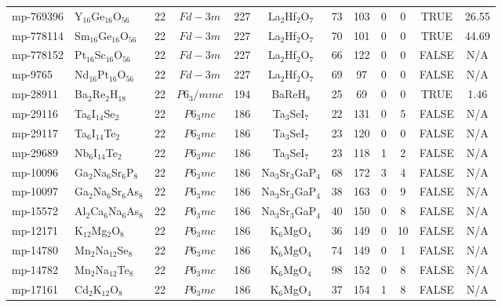 {\begin{longtable}{llcccccccccc}
    mp-769396 & Y$_{16}$Ge$_{16}$O$_{56}$ & 22    & $Fd-3m$ & 227   & La$_{2}$Hf$_{2}$O$_{7}$ & 73    & 103   & 0     & 0     & TRUE  & 26.55  \\
    mp-778114 & Sm$_{16}$Ge$_{16}$O$_{56}$ & 22    & $Fd-3m$ & 227   & La$_{2}$Hf$_{2}$O$_{7}$ & 70    & 101   & 0     & 0     & TRUE  & 44.69  \\
    mp-778152 & Pt$_{16}$Sc$_{16}$O$_{56}$ & 22    & $Fd-3m$ & 227   & La$_{2}$Hf$_{2}$O$_{7}$ & 66    & 122   & 0     & 0     & FALSE & N/A \\
    mp-9765 & Nd$_{16}$Pt$_{16}$O$_{56}$ & 22    & $Fd-3m$ & 227   & La$_{2}$Hf$_{2}$O$_{7}$ & 69    & 97    & 0     & 0     & FALSE & N/A \\
    mp-28911 & Ba$_{2}$Re$_{2}$H$_{18}$ & 22    & $P6_3/mmc$ & 194   & BaReH$_{9}$ & 25    & 69    & 0     & 0     & TRUE  & 1.46  \\
    mp-29116 & Ta$_{6}$I$_{14}$Se$_{2}$ & 22    & $P6_3mc$ & 186   & Ta$_{3}$SeI$_{7}$ & 22    & 131   & 0     & 5     & FALSE & N/A \\
    mp-29117 & Ta$_{6}$I$_{14}$Te$_{2}$ & 22    & $P6_3mc$ & 186   & Ta$_{3}$SeI$_{7}$ & 23    & 120   & 0     & 0     & FALSE & N/A \\
    mp-29689 & Nb$_{6}$I$_{14}$Te$_{2}$ & 22    & $P6_3mc$ & 186   & Ta$_{3}$SeI$_{7}$ & 23    & 118   & 1     & 2     & FALSE & N/A \\
    mp-10096 & Ga$_{2}$Na$_{6}$Sr$_{6}$P$_{8}$ & 22    & $P6_3mc$ & 186   & Na$_{3}$Sr$_{3}$GaP$_{4}$ & 68    & 172   & 3     & 4     & FALSE & N/A \\
    mp-10097 & Ga$_{2}$Na$_{6}$Sr$_{6}$As$_{8}$ & 22    & $P6_3mc$ & 186   & Na$_{3}$Sr$_{3}$GaP$_{4}$ & 38    & 163   & 0     & 9     & FALSE & N/A \\
    mp-15572 & Al$_{2}$Ca$_{6}$Na$_{6}$As$_{8}$ & 22    & $P6_3mc$ & 186   & Na$_{3}$Sr$_{3}$GaP$_{4}$ & 40    & 150   & 0     & 8     & FALSE & N/A \\
    mp-12171 & K$_{12}$Mg$_{2}$O$_{8}$ & 22    & $P6_3mc$ & 186   & K$_{6}$MgO$_{4}$ & 36    & 149   & 0     & 10    & FALSE & N/A \\
    mp-14780 & Mn$_{2}$Na$_{12}$Se$_{8}$ & 22    & $P6_3mc$ & 186   & K$_{6}$MgO$_{4}$ & 74    & 149   & 0     & 1     & FALSE & N/A \\
    mp-14782 & Mn$_{2}$Na$_{12}$Te$_{8}$ & 22    & $P6_3mc$ & 186   & K$_{6}$MgO$_{4}$ & 98    & 152   & 0     & 8     & FALSE & N/A \\
    mp-17161 & Cd$_{2}$K$_{12}$O$_{8}$ & 22    & $P6_3mc$ & 186   & K$_{6}$MgO$_{4}$ & 37    & 154   & 1     & 8     & FALSE & N/A \\

\end{longtable}}
